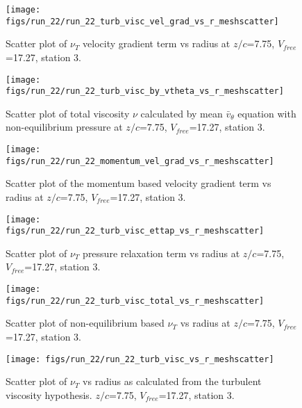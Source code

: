 \begin{figure}[H]
\centering
\texttt{[image: figs/run\_22/run\_22\_turb\_visc\_vel\_grad\_vs\_r\_meshscatter]}
\caption{Scatter plot of $\nu_T$ velocity gradient term vs radius at $z/c$=7.75, $V_{free}$=17.27, station 3.}
\end{figure}


\begin{figure}[H]
\centering
\texttt{[image: figs/run\_22/run\_22\_turb\_visc\_by\_vtheta\_vs\_r\_meshscatter]}
\caption{Scatter plot of total viscosity $\nu$ calculated by mean $\bar{v}_{\theta}$ equation with non-equilibrium pressure at $z/c$=7.75, $V_{free}$=17.27, station 3.}
\end{figure}


\begin{figure}[H]
\centering
\texttt{[image: figs/run\_22/run\_22\_momentum\_vel\_grad\_vs\_r\_meshscatter]}
\caption{Scatter plot of the momentum based velocity gradient term vs radius at $z/c$=7.75, $V_{free}$=17.27, station 3.}
\end{figure}


\begin{figure}[H]
\centering
\texttt{[image: figs/run\_22/run\_22\_turb\_visc\_ettap\_vs\_r\_meshscatter]}
\caption{Scatter plot of $\nu_T$ pressure relaxation term vs radius at $z/c$=7.75, $V_{free}$=17.27, station 3.}
\end{figure}


\begin{figure}[H]
\centering
\texttt{[image: figs/run\_22/run\_22\_turb\_visc\_total\_vs\_r\_meshscatter]}
\caption{Scatter plot of non-equilibrium based $\nu_T$ vs radius at $z/c$=7.75, $V_{free}$=17.27, station 3.}
\end{figure}


\begin{figure}[H]
\centering
\texttt{[image: figs/run\_22/run\_22\_turb\_visc\_vs\_r\_meshscatter]}
\caption{Scatter plot of $\nu_T$ vs radius as calculated from the turbulent viscosity hypothesis. $z/c$=7.75, $V_{free}$=17.27, station 3.}
\end{figure}


